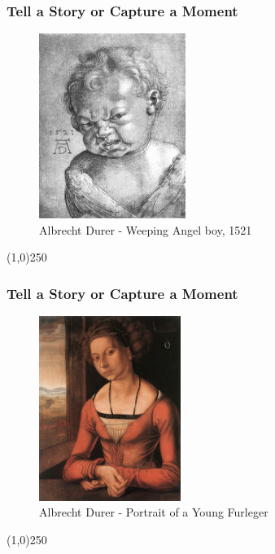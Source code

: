 \begin{frame}
\frametitle{Tell a Story or Capture a Moment}
\begin{figure}
	\centering
		\includegraphics[height=6cm]{img/candc/DurerAngelBoy.jpg}
	\caption{Albrecht Durer - Weeping Angel boy, 1521}
	\label{fig:DurerAngelBoy}
\end{figure}
\end{frame}
\begin{center}\line(1,0){250}\end{center}




\begin{frame}
\frametitle{Tell a Story or Capture a Moment}
\begin{figure}
	\centering
		\includegraphics[height=6cm]{img/candc/Durerfurleger.jpg}
	\caption{Albrecht Durer - Portrait of a Young Furleger}
	\label{fig:DurerYoungFurleger}
\end{figure}
\end{frame}
\begin{center}\line(1,0){250}\end{center}




